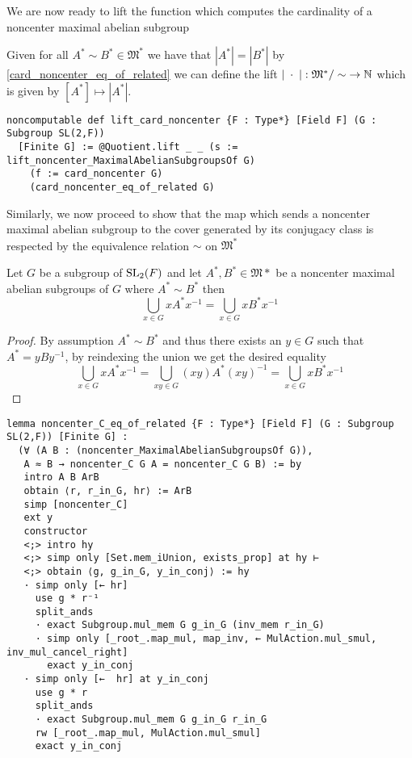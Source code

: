 We are now ready to lift the function which computes the cardinality of a noncenter maximal abelian subgroup

\begin{definition}
  \label{lift_card_noncenter}
  \leanok 
  Given for all $A^* \sim B^* \in \mathfrak{M}^*$ we have that $|A^*| = |B^*|$ by \ref{card_noncenter_eq_of_related} we can define the lift
  $|\; \cdot \;| : \mathfrak{M}^* / \sim \; \rightarrow \mathbb{N}$ which is given by $[A^*] \mapsto |A^*|$.
\end{definition}
\begin{footnotesize}
\begin{verbatim}
noncomputable def lift_card_noncenter {F : Type*} [Field F] (G : Subgroup SL(2,F))
  [Finite G] := @Quotient.lift _ _ (s := lift_noncenter_MaximalAbelianSubgroupsOf G)
    (f := card_noncenter G)
    (card_noncenter_eq_of_related G)
\end{verbatim}
\end{footnotesize}

Similarly, we now proceed to show that the map which sends a noncenter maximal abelian subgroup to the cover generated by its conjugacy class is respected by the equivalence relation $\sim$ on $\mathfrak{M}^*$

\begin{lemma}
  \label{noncenter_C_eq_of_related}
  \leanok
  Let $G$ be a subgroup of $\operatorname{SL}_2(F)$ and let $A^* , B^* \in \mathfrak{M}*$ be a noncenter maximal abelian subgroups of $G$ where $A^* \sim B^*$
  then 
  \[
  \bigcup_{x \in G} x A^* x^{-1} = \bigcup_{x \in G} x B^* x^{-1}
  \]
\end{lemma}
\begin{proof}
By assumption $A^* \sim B^*$ and thus there exists an $y \in G$ such that $A^* = yBy^{-1}$, by reindexing the union we get the desired equality
\[
  \bigcup_{x \in G} x A^* x^{-1} = \bigcup_{xy \in G} (xy) A^* (xy)^{-1}  = \bigcup_{x \in G} x B^* x^{-1}
  \]
\end{proof}
\begin{footnotesize}
\begin{verbatim}
lemma noncenter_C_eq_of_related {F : Type*} [Field F] (G : Subgroup SL(2,F)) [Finite G] :
  (∀ (A B : (noncenter_MaximalAbelianSubgroupsOf G)),
   A ≈ B → noncenter_C G A = noncenter_C G B) := by
   intro A B ArB
   obtain ⟨r, r_in_G, hr⟩ := ArB
   simp [noncenter_C]
   ext y
   constructor
   <;> intro hy
   <;> simp only [Set.mem_iUnion, exists_prop] at hy ⊢
   <;> obtain ⟨g, g_in_G, y_in_conj⟩ := hy
   · simp only [← hr]
     use g * r⁻¹
     split_ands
     · exact Subgroup.mul_mem G g_in_G (inv_mem r_in_G)
     · simp only [_root_.map_mul, map_inv, ← MulAction.mul_smul, inv_mul_cancel_right]
       exact y_in_conj
   · simp only [←  hr] at y_in_conj
     use g * r
     split_ands
     · exact Subgroup.mul_mem G g_in_G r_in_G
     rw [_root_.map_mul, MulAction.mul_smul]
     exact y_in_conj
\end{verbatim}
\end{footnotesize}

